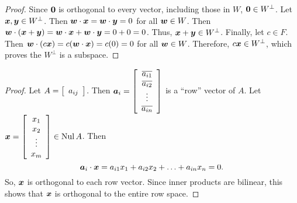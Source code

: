 \begin{proof}
Since $\bb 0$ is orthogonal to every vector, including those in $W$, $\bb 0 \in W^\perp$. Let $\bb x, \bb y\in W^\perp$. Then $\bb w\cdot \bb x = \bb w\cdot \bb y = 0$ for all $\bb w\in W$. Then $\bb w \cdot ( \bb x + \bb y) = \bb w\cdot \bb x + \bb w\cdot \bb y = 0+0 = 0$. Thus, $\bb x + \bb y\in W^\perp$. Finally, let $c\in F$. Then $\bb w\cdot (c\bb x) =  c(\bb w\cdot \bb x) = c(0) = 0$ for all $\bb w \in W$. Therefore, $c\bb x\in W^\perp$, which proves the $W^\perp$ is a subspace.
\end{proof}\vs


\begin{proof}
Let $A = \mtx{c}{a_{ij}}$.  Then $\bb a_i = \mtx{c}{\overline{a_{i1}} \\ \overline{a_{i2}} \\\vdots \\ \overline{a_{in}}}$ is a ``row'' vector of $A$. Let $\bb x = \mtx{c}{x_1\\x_2\\\vdots\\x_m}\in \nul A$. Then \[\bb a_i \cdot \bb x = a_{i1}x_1 + a_{i2}x_2 + \ldots + a_{in}x_n = 0.\] So, $\bb x$ is orthogonal to each row vector. Since inner products are bilinear, this shows that $\bb x$ is orthogonal to the entire row space.
\end{proof}\vs

